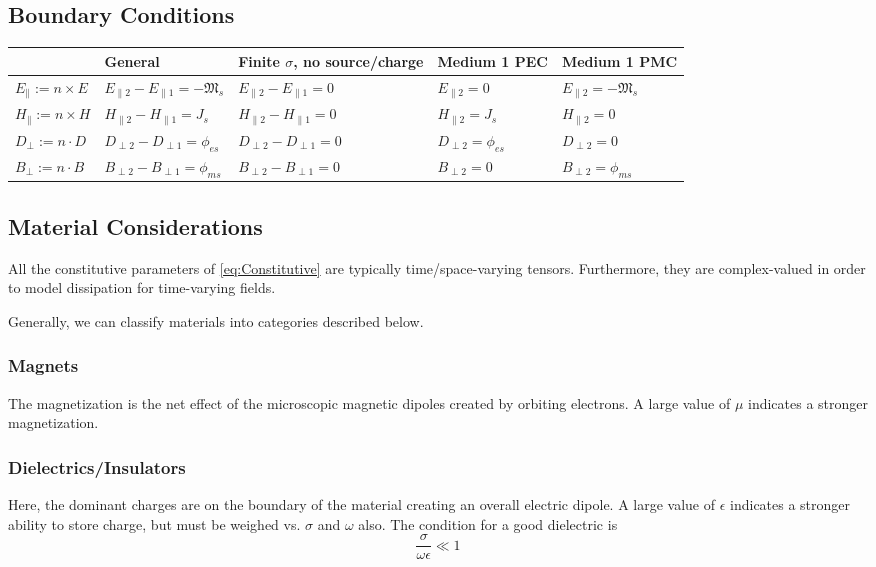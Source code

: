 \documentclass{article}
\begin{document}
\subsection{Boundary Conditions}

\scriptsize
\begin{tabular}{ | m{6.5em} || m{7.9em} | m{7.5em} | m{7.7em} | m{7.9em} | }
    \hline
    & \textbf{General} & \textbf{Finite \( \sigma \), no source/charge} & \textbf{Medium 1 PEC} & \textbf{Medium 1 PMC} \\
    \hline\hline
    \( E_{\parallel} := n \times E \) & \( E_{\parallel 2} - E_{\parallel 1} = -\mathfrak{M}_s \) & \( E_{\parallel 2} - E_{\parallel 1} = 0 \) & \( E_{\parallel 2} = 0 \) & \( E_{\parallel 2} = -\mathfrak{M}_s \) \\
    \( H_{\parallel} := n \times H \) & \( H_{\parallel 2} - H_{\parallel 1} = J_s \) & \( H_{\parallel 2} - H_{\parallel 1} = 0 \) & \( H_{\parallel 2} = J_s \) & \( H_{\parallel 2} = 0 \) \\
    \( D_{\perp} := n \cdot D \) & \( D_{\perp 2} - D_{\perp 1} = \phi_{es} \) & \( D_{\perp 2} - D_{\perp 1} = 0 \) & \( D_{\perp 2} = \phi_{es} \) & \( D_{\perp 2} = 0 \) \\
    \( B_{\perp} := n \cdot B \) & \( B_{\perp 2} - B_{\perp 1} = \phi_{ms} \) & \( B_{\perp 2} - B_{\perp 1} = 0 \) & \( B_{\perp 2} = 0 \) & \( B_{\perp 2} = \phi_{ms} \) \\
    \hline
\end{tabular}
\newpage
\normalsize
\subsection{Material Considerations}
All the constitutive parameters of \eqref{eq:Constitutive} are typically time/space-varying tensors. Furthermore, they are complex-valued in order to model dissipation for time-varying fields.

Generally, we can classify materials into categories described below.

\subsubsection{Magnets} The magnetization is the net effect of the microscopic magnetic dipoles created by orbiting electrons. A large value of $\mu$ indicates a stronger magnetization.
\subsubsection{Dielectrics/Insulators}
Here, the dominant charges are on the boundary of the material creating an overall electric dipole. A large value of $\epsilon$ indicates a stronger ability to store charge, but must be weighed vs. $\sigma$ and $\omega$ also. The condition for a good dielectric is
    \begin{equation} \label{eq:dielectric}
        \frac{\sigma}{\omega \epsilon} \ll 1
    \end{equation}
\end{document}
